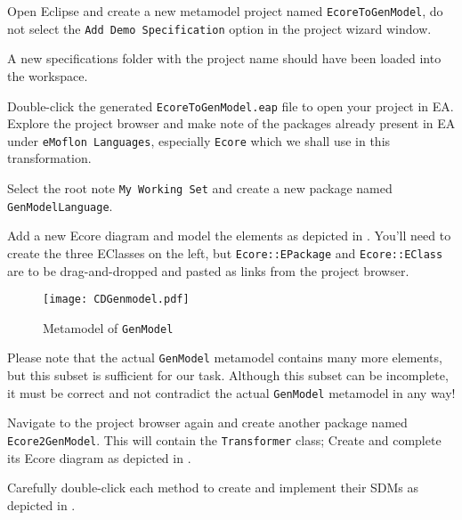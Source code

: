 \begin{stepbystep}

\item Open Eclipse and create a new metamodel project named \texttt{Ecore\-To\-Gen\-Model}, do not select the \texttt{Add Demo Specification}
option in the project wizard window.

\item A new specifications folder with the project name should have been loaded into the workspace.

\item Double-click the generated \texttt{Ecore\-To\-Gen\-Model.eap} file to open your project in EA. 
Explore the project browser and make note of the packages already present in EA under \texttt{eMoflon Languages}, especially \texttt{Ecore} which we shall use in this transformation.

\item Select the root note \texttt{My Working Set} and create a new package named \texttt{Gen\-Model\-Language}. 

\item Add a new Ecore diagram and model the elements as depicted in . You'll need to create the three EClasses on
the left, but \texttt{Ecore::EPackage} and \texttt{Ecore::EClass} are to be drag-and-dropped and pasted as links from the project browser. 

\vspace{0.5cm}

\begin{figure}[htbp]
\begin{center}  
	\texttt{[image: CDGenmodel.pdf]}
	\caption{Metamodel of \texttt{GenModel}}  
\label{fig_gMM}
\end{center}
\end{figure} 

\vspace{0.5cm}

\item Please note that the actual \texttt{GenModel} metamodel contains many more elements, but this subset is sufficient for our
task.
Although this subset can be incomplete, it must be correct and not contradict the actual \texttt{GenModel} metamodel in any way!

\item Navigate to the project browser again and create another package named \texttt{Ecore2GenModel}.  
This will contain the \texttt{Transformer} class; Create and complete its Ecore diagram as depicted in .

\item Carefully double-click each method to create and implement their SDMs as depicted in .
\end{stepbystep}

